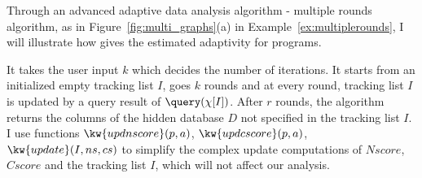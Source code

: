 Through an advanced adaptive data analysis algorithm - multiple rounds algorithm, 
as in Figure~\ref{fig:multi_graphs}(a) in Example~\ref*{ex:multiplerounds}, I will illustrate how \THESYSTEM gives
the estimated adaptivity for programs.
\begin{example}
\label{ex:multiplerounds}
%
It takes the user input $k$ which decides the 
number of iterations.
It starts from an initialized empty tracking list $I$,
{ goes $k$ rounds and at every round, tracking list $I$ is updated by a query result of $\query(\chi[I])$.
After $r$ rounds, the algorithm returns the columns of the hidden database $D$ not specified in the tracking list $I$.
I use functions $\kw{updnscore}(p,a)$,
$\kw{updcscore}(p,a)$,$\kw{update}(I,ns,cs)$ to simplify the complex update computations of $Nscore$, $Cscore$ and the tracking list $I$, 
which will not affect our analysis.%
}


\end{example}
